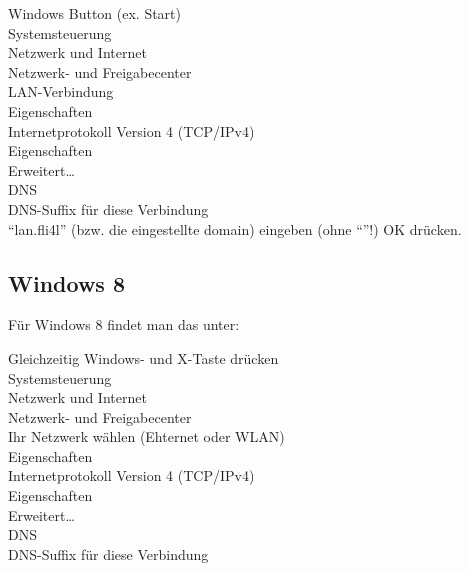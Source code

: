   \noindent Windows Button (ex. Start) \pfeil\\
  \hspace*{2ex}Systemsteuerung \pfeil\\
  \hspace*{4ex}Netzwerk und Internet \pfeil\\
  \hspace*{6ex}Netzwerk- und Freigabecenter \pfeil\\
  \hspace*{8ex}LAN-Verbindung \pfeil\\
  \hspace*{10ex}Eigenschaften \pfeil\\
  \hspace*{12ex}Internetprotokoll Version 4 (TCP/IPv4) \pfeil\\
  \hspace*{14ex}Eigenschaften \pfeil\\
  \hspace*{16ex}Erweitert\ldots \pfeil\\
  \hspace*{18ex}DNS \pfeil\\
  \hspace*{20ex}DNS-Suffix für diese Verbindung \pfeil\\

  ``lan.fli4l'' (bzw. die eingestellte domain) eingeben (ohne ``''!)
  \pfeil OK drücken.

\subsection{Windows 8}

  Für Windows 8 findet man das unter:

  \noindent Gleichzeitig Windows- und X-Taste drücken \pfeil\\
  \hspace*{2ex}Systemsteuerung \pfeil\\
  \hspace*{4ex}Netzwerk und Internet \pfeil\\
  \hspace*{6ex}Netzwerk- und Freigabecenter \pfeil\\
  \hspace*{8ex}Ihr Netzwerk wählen (Ehternet oder WLAN) \pfeil\\
  \hspace*{10ex}Eigenschaften \pfeil\\
  \hspace*{12ex}Internetprotokoll Version 4 (TCP/IPv4) \pfeil\\
  \hspace*{14ex}Eigenschaften \pfeil\\
  \hspace*{16ex}Erweitert\ldots \pfeil\\
  \hspace*{18ex}DNS \pfeil\\
  \hspace*{20ex}DNS-Suffix für diese Verbindung \pfeil\\

